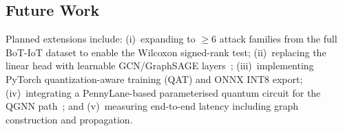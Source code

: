 \documentclass[conference]{IEEEtran}
\begin{document}
\subsection{Future Work}
Planned extensions include: (i)~expanding to ${\ge}6$ attack families from
the full BoT-IoT dataset to enable the Wilcoxon signed-rank test;
(ii)~replacing the linear head with learnable GCN/GraphSAGE
layers~\cite{hamilton2017inductive}; (iii)~implementing PyTorch
quantization-aware training (QAT) and ONNX INT8 export;
(iv)~integrating a PennyLane-based parameterised quantum circuit for the QGNN
path~\cite{farhi2018classification}; and (v)~measuring end-to-end latency
including graph construction and propagation.

\balance
\end{document}

